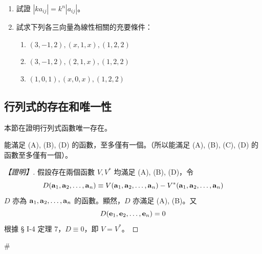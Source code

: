 \begin{enumerate}[label=\arabic*., leftmargin=2em]
  \item[\textbf{*9.}] 試證 $|k a_{ij}| = k^n |a_{ij}|$。

  \item 試求下列各三向量為線性相關的充要條件：
  \begin{enumerate}[label=(\roman*)]
    \item $(3, -1, 2), (x, 1, x), (1, 2, 2)$
    \item $(3, -1, 2), (2, 1, x), (1, 2, 2)$
    \item $(1, 0, 1), (x, 0, x), (1, 2, 2)$
  \end{enumerate}
\end{enumerate}

\subsection{行列式的存在和唯一性}\label{sec:b6-1-5}
\resetsectcounters

本節在證明行列式函數唯一存在。

\begin{theorem}\label{thm:b6-1-10}
能滿足 (A), (B), (D) 的函數，至多僅有一個。（所以能滿足 (A), (B), (C), (D) 的函數至多僅有一個）。
\end{theorem}

\begin{proof}[【證明】]
假設存在兩個函數 $V, V^*$ 均滿足 (A), (B), (D)，令
\[ D(\boldsymbol{\mathbf{a}}_1, \boldsymbol{\mathbf{a}}_2, \dots, \boldsymbol{\mathbf{a}}_n) \equiv V(\boldsymbol{\mathbf{a}}_1, \boldsymbol{\mathbf{a}}_2, \dots, \boldsymbol{\mathbf{a}}_n) - V^*(\boldsymbol{\mathbf{a}}_1, \boldsymbol{\mathbf{a}}_2, \dots, \boldsymbol{\mathbf{a}}_n) \]
$D$ 亦為 $\boldsymbol{\mathbf{a}}_1, \boldsymbol{\mathbf{a}}_2, \dots, \boldsymbol{\mathbf{a}}_n$ 的函數。顯然，$D$ 亦滿足 (A), (B)。又
\[ D(\boldsymbol{\mathbf{e}}_1, \boldsymbol{\mathbf{e}}_2, \dots, \boldsymbol{\mathbf{e}}_n) = 0 \]
根據 § I-4 定理 7，$D \equiv 0$，即 $V = V^*$。
\end{proof}\hfill$\#$

